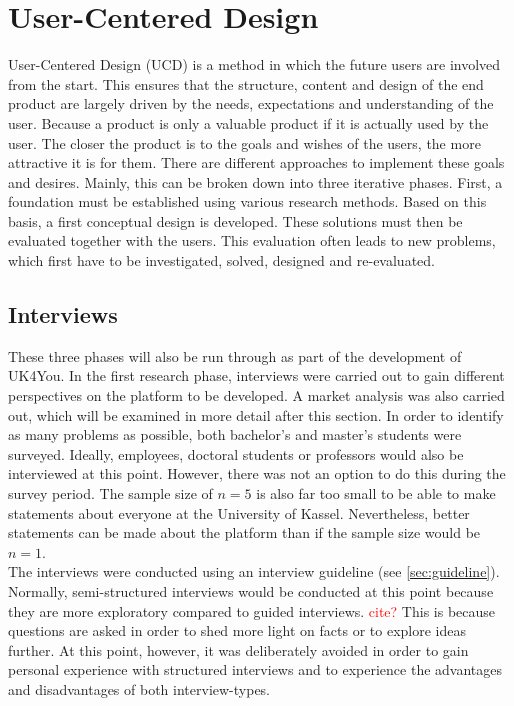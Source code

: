 \section{User-Centered Design}
User-Centered Design (UCD) is a method in which the future users are involved from the start\cite{handbook-usability}.
This ensures that the structure, content and design of the end product are largely driven by the needs, expectations and understanding of the user.
Because a product is only a valuable product if it is actually used by the user.
The closer the product is to the goals and wishes of the users, the more attractive it is for them.
There are different approaches to implement these goals and desires.
Mainly, this can be broken down into three iterative phases.
First, a foundation must be established using various research methods.
Based on this basis, a first conceptual design is developed.
These solutions must then be evaluated together with the users.
This evaluation often leads to new problems, which first have to be investigated, solved, designed and re-evaluated.\\

\subsection{Interviews}
These three phases will also be run through as part of the development of UK4You.
In the first research phase, interviews were carried out to gain different perspectives on the platform to be developed.
A market analysis was also carried out, which will be examined in more detail after this section.
In order to identify as many problems as possible, both bachelor's and master's students were surveyed.
Ideally, employees, doctoral students or professors would also be interviewed at this point.
However, there was not an option to do this during the survey period.
The sample size of $n=5$ is also far too small to be able to make statements about everyone at the University of Kassel.
Nevertheless, better statements can be made about the platform than if the sample size would be $n=1$.\\

The interviews were conducted using an interview guideline (see \autoref{sec:guideline}).
Normally, semi-structured interviews would be conducted at this point because they are more exploratory compared to guided interviews. \textcolor{red}{cite?}
This is because questions are asked in order to shed more light on facts or to explore ideas further.
At this point, however, it was deliberately avoided in order to gain personal experience with structured interviews and to experience the advantages and disadvantages of both interview-types.\\

